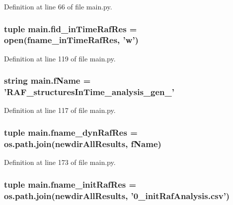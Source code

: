 Definition at line 66 of file main.\-py.

\hypertarget{a00111_ab82095abcedb97b7abf8e003f4724d0c}{
\subsubsection[{fid\-\_\-in\-Time\-Raf\-Res}]{\setlength{\rightskip}{0pt plus 5cm}tuple main.\-fid\-\_\-in\-Time\-Raf\-Res = open({\bf fname\-\_\-in\-Time\-Raf\-Res}, 'w')}}\label{a00111_ab82095abcedb97b7abf8e003f4724d0c}


Definition at line 119 of file main.\-py.

\hypertarget{a00111_a9fff4b23f9489649601960dabc4a6cdd}{
\subsubsection[{f\-Name}]{\setlength{\rightskip}{0pt plus 5cm}string main.\-f\-Name = 'R\-A\-F\-\_\-structures\-In\-Time\-\_\-analysis\-\_\-gen\-\_\-'}}\label{a00111_a9fff4b23f9489649601960dabc4a6cdd}


Definition at line 117 of file main.\-py.

\hypertarget{a00111_a6a031fb0c5a0a5519fc4c3f6d7ef35d1}{
\subsubsection[{fname\-\_\-dyn\-Raf\-Res}]{\setlength{\rightskip}{0pt plus 5cm}tuple main.\-fname\-\_\-dyn\-Raf\-Res = os.\-path.\-join({\bf newdir\-All\-Results}, {\bf f\-Name})}}\label{a00111_a6a031fb0c5a0a5519fc4c3f6d7ef35d1}


Definition at line 173 of file main.\-py.

\hypertarget{a00111_a72ed3f9434cc4dcc2240c6ca408960ff}{
\subsubsection[{fname\-\_\-init\-Raf\-Res}]{\setlength{\rightskip}{0pt plus 5cm}tuple main.\-fname\-\_\-init\-Raf\-Res = os.\-path.\-join({\bf newdir\-All\-Results}, '0\-\_\-init\-Raf\-Analysis.\-csv')}}\label{a00111_a72ed3f9434cc4dcc2240c6ca408960ff}


